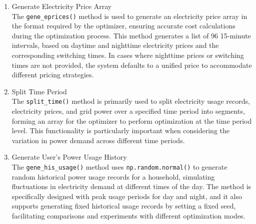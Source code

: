 \documentclass[
	english,
	ruledheaders=section,%
	class=report,%
	thesis={type=Report},%
	accentcolor=9c,%
	custommargins=true,%
	marginpar=false,%
	parskip=half-,%
	fontsize=11pt,%
	logofile={img/tuda_logo.pdf}, %
]{tudapub}
\begin{document}
\begin{enumerate}
    

    \item Generate Electricity Price Array\\
    The \texttt{gene\_eprices()} method is used to generate an electricity price array in the format required by the optimizer, ensuring accurate cost calculations during the optimization process. This method generates a list of 96 15-minute intervals, based on daytime and nighttime electricity prices and the corresponding switching times. In cases where nighttime prices or switching times are not provided, the system defaults to a unified price to accommodate different pricing strategies.



    \item Split Time Period\\
    The \texttt{split\_time()} method is primarily used to split electricity usage records, electricity prices, and grid power over a specified time period into segments, forming an array for the optimizer to perform optimization at the time period level. This functionality is particularly important when considering the variation in power demand across different time periods.

    

    \item Generate User's Power Usage History\\
    The \texttt{gene\_his\_usage()} method uses \texttt{np.random.normal()} to generate random historical power usage records for a household, simulating fluctuations in electricity demand at different times of the day. The method is specifically designed with peak usage periods for day and night, and it also supports generating fixed historical usage records by setting a fixed seed, facilitating comparisons and experiments with different optimization modes.


\end{enumerate}
\end{document}
